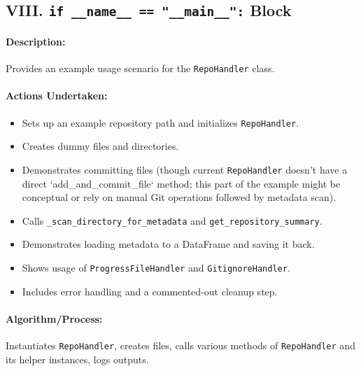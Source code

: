 \documentclass{article}
\begin{document}
\subsection{VIII. \texttt{if \_\_name\_\_ == "\_\_main\_\_":} Block}
\paragraph{Description:} Provides an example usage scenario for the \texttt{RepoHandler} class.
\paragraph{Actions Undertaken:}
\begin{itemize}
    \item Sets up an example repository path and initializes \texttt{RepoHandler}.
    \item Creates dummy files and directories.
    \item Demonstrates committing files (though current \texttt{RepoHandler} doesn't have a direct `add_and_commit_file` method; this part of the example might be conceptual or rely on manual Git operations followed by metadata scan).
    \item Calls \texttt{\_scan\_directory\_for\_metadata} and \texttt{get\_repository\_summary}.
    \item Demonstrates loading metadata to a DataFrame and saving it back.
    \item Shows usage of \texttt{ProgressFileHandler} and \texttt{GitignoreHandler}.
    \item Includes error handling and a commented-out cleanup step.
\end{itemize}
\paragraph{Algorithm/Process:} Instantiates \texttt{RepoHandler}, creates files, calls various methods of \texttt{RepoHandler} and its helper instances, logs outputs.
\end{document}
